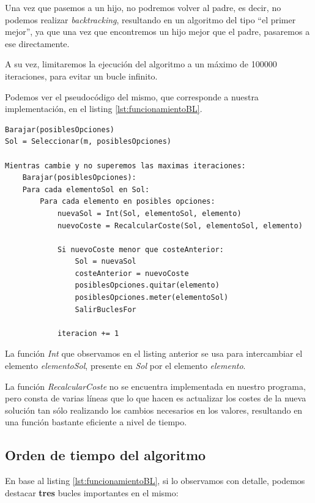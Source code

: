 Una vez que pasemos a un hijo, no podremos volver al padre, es decir, no podemos realizar \textit{backtracking}, resultando en un algoritmo del tipo ``el primer mejor'', ya que una vez que encontremos un hijo mejor que el padre, pasaremos a ese directamente.

A su vez, limitaremos la ejecución del algoritmo a un máximo de 100000 iteraciones, para evitar un bucle infinito.

Podemos ver el pseudocódigo del mismo, que corresponde a nuestra implementación, en el listing \ref{lst:funcionamientoBL}.
\newpage
\begin{lstlisting}[frame=single, caption={Funcionamiento del de búsqueda local}, captionpos=b, label=lst:funcionamientoBL]
Barajar(posiblesOpciones)
Sol = Seleccionar(m, posiblesOpciones)

Mientras cambie y no superemos las maximas iteraciones:
    Barajar(posiblesOpciones):
    Para cada elementoSol en Sol:
        Para cada elemento en posibles opciones:
            nuevaSol = Int(Sol, elementoSol, elemento)
            nuevoCoste = RecalcularCoste(Sol, elementoSol, elemento)
            
            Si nuevoCoste menor que costeAnterior:
                Sol = nuevaSol
                costeAnterior = nuevoCoste
                posiblesOpciones.quitar(elemento)
                posiblesOpciones.meter(elementoSol)
                SalirBuclesFor
                
            iteracion += 1

\end{lstlisting}

La función \textit{Int} que observamos en el listing anterior se usa para intercambiar el elemento \textit{elementoSol}, presente en \textit{Sol} por el elemento \textit{elemento}.

La función \textit{RecalcularCoste} no se encuentra implementada en nuestro programa, pero consta de varias líneas que lo que hacen es actualizar los costes de la nueva solución tan sólo realizando los cambios necesarios en los valores, resultando en una función bastante eficiente a nivel de tiempo.

\subsection{Orden de tiempo del algoritmo}

En base al listing \ref{lst:funcionamientoBL}, si lo observamos con detalle, podemos destacar \textbf{tres} bucles importantes en el mismo:

